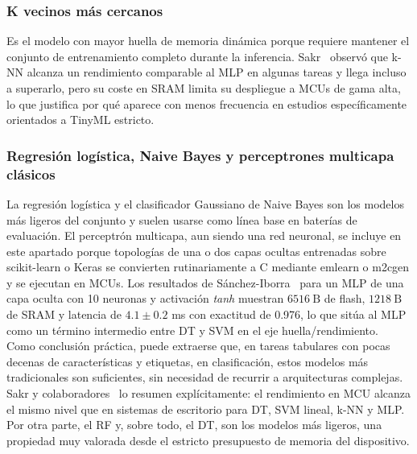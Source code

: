 \documentclass[a4paper,12pt,twoside,final]{book}
\begin{document}
\subsubsection{K vecinos más cercanos}
Es el modelo con mayor huella de memoria dinámica porque requiere mantener el conjunto de entrenamiento completo
durante la inferencia. Sakr~\cite{sakr2022sensors} observó que k-NN alcanza un rendimiento comparable al MLP en
algunas tareas y llega incluso a superarlo, pero su coste en SRAM limita su despliegue a MCUs de gama alta, lo que
justifica por qué aparece con menos frecuencia en estudios específicamente orientados a TinyML estricto.

\subsubsection{Regresión logística, Naive Bayes y perceptrones multicapa clásicos}
La regresión logística y el clasificador Gaussiano de Naive Bayes son los modelos más ligeros del conjunto y suelen
usarse como línea base en baterías de evaluación. El perceptrón multicapa, aun siendo una red neuronal, se incluye en
este apartado porque topologías de una o dos capas ocultas entrenadas sobre scikit-learn o Keras se convierten
rutinariamente a C mediante emlearn o m2cgen y se ejecutan en MCUs. Los resultados de
Sánchez-Iborra~\cite{sanchez-iborra2022informatica} para un MLP de una capa oculta con 10 neuronas y activación
\textit{tanh} muestran $6516~\mathrm{B}$ de flash, $1218~\mathrm{B}$ de SRAM y latencia de $4.1 \pm 0.2$ ms con
exactitud de 0.976, lo que sitúa al MLP como un término intermedio entre DT y SVM en el eje huella/rendimiento.\\

Como conclusión práctica, puede extraerse que, en tareas tabulares con pocas decenas de características y etiquetas,
en clasificación, estos modelos más tradicionales son suficientes, sin necesidad de recurrir a arquitecturas
complejas. Sakr y colaboradores~\cite{sakr2022sensors} lo resumen explícitamente: el rendimiento en MCU alcanza el
mismo nivel que en sistemas de escritorio para DT, SVM lineal, k-NN y MLP. Por otra parte, el RF y, sobre todo, el
DT, son los modelos más ligeros, una propiedad muy valorada desde el estricto presupuesto de memoria del dispositivo.

\newpage
\end{document}
